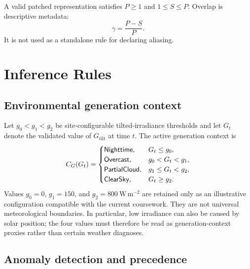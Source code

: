 

A valid patched representation satisfies $P\geq1$ and $1\leq S\leq P$. Overlap is descriptive metadata:
\begin{equation}
\label{eq:overlap}
\gamma=\frac{P-S}{P}.
\end{equation}
It is not used as a standalone rule for declaring aliasing.

\section{Inference Rules}

\subsection{Environmental generation context}

Let $g_0<g_1<g_2$ be site-configurable tilted-irradiance thresholds and let $G_t$ denote the validated value of $G_{\mathrm{tilt}}$ at time $t$. The active generation context is
\begin{equation}
\label{eq:generation-context}
C_G(G_t)=
\begin{cases}
\textsf{Nighttime}, & G_t\leq g_0,\\
\textsf{Overcast}, & g_0<G_t<g_1,\\
\textsf{PartialCloud}, & g_1\leq G_t<g_2,\\
\textsf{ClearSky}, & G_t\geq g_2.
\end{cases}
\end{equation}
Values $g_0=0$, $g_1=150$, and $g_2=800\ \mathrm{W\,m^{-2}}$ are retained only as an illustrative configuration compatible with the current coursework. They are not universal meteorological boundaries. In particular, low irradiance can also be caused by solar position; the four values must therefore be read as generation-context proxies rather than certain weather diagnoses.

\subsection{Anomaly detection and precedence}

